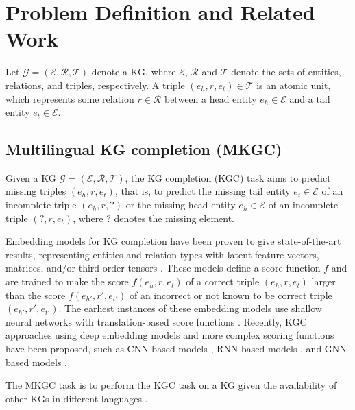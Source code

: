 \documentclass[11pt]{article}
\begin{document}
\section{Problem Definition and Related Work}

Let  $\mathcal{G} = (\mathcal{E}, \mathcal{R}, \mathcal{T})$ denote a KG, where $\mathcal{E}$,  $\mathcal{R}$ and $\mathcal{T}$ denote the sets of entities, relations, and triples, respectively. A triple $(e_h, r, e_t) \in \mathcal{T}$ is an atomic unit, which represents some relation $r \in \mathcal{R}$ between a head entity $e_h \in \mathcal{E}$ and a tail entity $e_t \in \mathcal{E}$. 

\subsection{Multilingual KG completion (MKGC)}\label{ssec:mkgc}


Given a KG $\mathcal{G} = ({\mathcal{E}}, {\mathcal{R}}, {\mathcal{T}})$, the KG completion (KGC) task aims to predict missing triples $(e_h, r, e_t)$, that is, to predict the missing tail entity $e_t \in \mathcal{E}$ of an incomplete triple $(e_h, r, ?)$ or the missing head entity $e_h \in \mathcal{E}$ of an incomplete triple $(?, r, e_t)$, where ? denotes the missing element. 

Embedding models for KG completion have been proven to give state-of-the-art results, representing entities and relation types with latent feature vectors, matrices, and/or third-order tensors \cite{Nguyen2020KGC,Ji_2021}. These models define a score function $f$ and are trained to make the score $f(e_h, r, e_t)$ of a correct triple $(e_h, r, e_t)$ larger than the score $f(e_{h'}, r', e_{t'})$ of an incorrect or not known to be correct triple $(e_{h'}, r', e_{t'})$. 
The earliest instances of these embedding models use shallow neural networks with translation-based score functions \cite{bordes2013translating, wang2014knowledge, lin2015learning}. Recently, KGC approaches using deep embedding models and more complex scoring functions have been proposed, such as CNN-based models \cite{dettmers2018convolutional, nguyen2017novel}, RNN-based models \cite{liu2017analogical, guo2018dskg}, and GNN-based models \cite{SchlichtkrullKB17,shang2019end, vashishth2019composition,nguyen2021node}.

The MKGC task is to perform the KGC task on a KG given the availability of other KGs in different languages \cite{chen2020multilingual,huang2022multilingual}.
\end{document}

